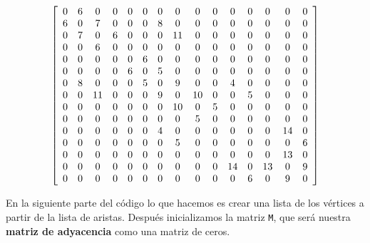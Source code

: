 \documentclass[
]{article}
\begin{document}
    \[
        \left[
            \begin{array}{*{15}c}
                0 & 6 & 0 & 0 & 0 & 0 & 0 & 0 & 0 & 0 & 0 & 0 & 0 & 0 & 0 \\
                6 & 0 & 7 & 0 & 0 & 0 & 8 & 0 & 0 & 0 & 0 & 0 & 0 & 0 & 0 \\
                0 & 7 & 0 & 6 & 0 & 0 & 0 & 11 & 0 & 0 & 0 & 0 & 0 & 0 & 0 \\
                0 & 0 & 6 & 0 & 0 & 0 & 0 & 0 & 0 & 0 & 0 & 0 & 0 & 0 & 0 \\
                0 & 0 & 0 & 0 & 0 & 6 & 0 & 0 & 0 & 0 & 0 & 0 & 0 & 0 & 0 \\
                0 & 0 & 0 & 0 & 6 & 0 & 5 & 0 & 0 & 0 & 0 & 0 & 0 & 0 & 0 \\
                0 & 8 & 0 & 0 & 0 & 5 & 0 & 9 & 0 & 0 & 4 & 0 & 0 & 0 & 0 \\
                0 & 0 & 11 & 0 & 0 & 0 & 9 & 0 & 10 & 0 & 0 & 5 & 0 & 0 & 0 \\
                0 & 0 & 0 & 0 & 0 & 0 & 0 & 10 & 0 & 5 & 0 & 0 & 0 & 0 & 0 \\
                0 & 0 & 0 & 0 & 0 & 0 & 0 & 0 & 5 & 0 & 0 & 0 & 0 & 0 & 0 \\
                0 & 0 & 0 & 0 & 0 & 0 & 4 & 0 & 0 & 0 & 0 & 0 & 0 & 14 & 0 \\
                0 & 0 & 0 & 0 & 0 & 0 & 0 & 5 & 0 & 0 & 0 & 0 & 0 & 0 & 6 \\
                0 & 0 & 0 & 0 & 0 & 0 & 0 & 0 & 0 & 0 & 0 & 0 & 0 & 13 & 0 \\
                0 & 0 & 0 & 0 & 0 & 0 & 0 & 0 & 0 & 0 & 14 & 0 & 13 & 0 & 9 \\
                0 & 0 & 0 & 0 & 0 & 0 & 0 & 0 & 0 & 0 & 0 & 6 & 0 & 9 & 0 \\
            \end{array}
        \right]
    \]


En la siguiente parte del código lo que hacemos es crear una lista de
los vértices a partir de la lista de aristas. Después inicializamos la
matriz \texttt{M}, que será nuestra \textbf{matriz de adyacencia} como
una matriz de ceros.
\end{document}

